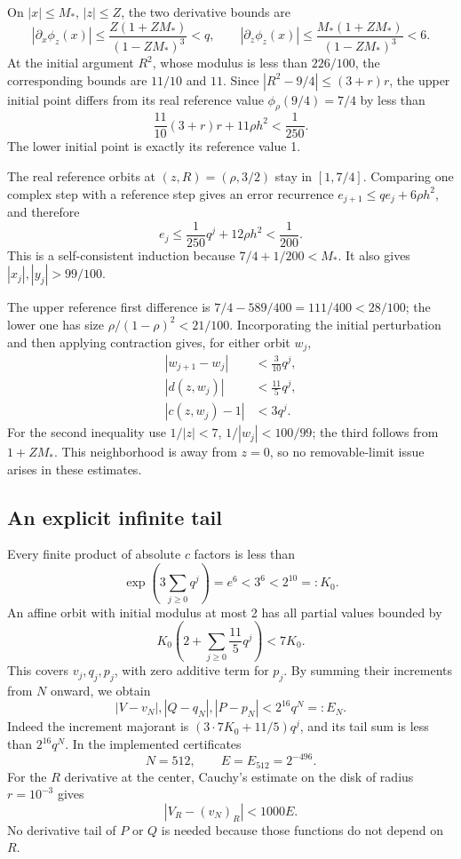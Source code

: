 \documentclass[11pt,letterpaper]{article}
\theoremstyle{remark}\newtheorem{remark}[theorem]{Remark}
\newcommand{\ph}{\phi_z}
\begin{document}
On $|x|\le M_*$, $|z|\le Z$, the two derivative bounds are
\[
 |\partial_x\ph(x)|
 \le\frac{Z(1+ZM_*)}{(1-ZM_*)^3}<q,
 \qquad
 |\partial_z\ph(x)|
 \le\frac{M_*(1+ZM_*)}{(1-ZM_*)^3}<6.
\]
At the initial argument $R^2$, whose modulus is less than $226/100$,
the corresponding bounds are $11/10$ and $11$. Since
$|R^2-9/4|\le(3+r)r$, the upper initial point differs from its
real reference value $\phi_\rho(9/4)=7/4$ by less than
\[
 \frac{11}{10}(3+r)r+11\rho h^2<\frac1{250}.
\]
The lower initial point is exactly its reference value 1.

The real reference orbits at $(z,R)=(\rho,3/2)$ stay in
$[1,7/4]$. Comparing one complex step with a reference step gives
an error recurrence $e_{j+1}\le q e_j+6\rho h^2$, and therefore
\begin{equation}\label{ivk:anc:referenceerror}
 e_j\le\frac1{250}q^j+12\rho h^2<\frac1{200}.
\end{equation}
This is a self-consistent induction because $7/4+1/200<M_*$.
It also gives $|x_j|,|y_j|>99/100$.

The upper reference first difference is
$7/4-589/400=111/400<28/100$; the lower one has size
$\rho/(1-\rho)^2<21/100$. Incorporating the initial perturbation
and then applying contraction gives, for either orbit $w_j$,
\begin{equation}\label{ivk:anc:tailpremises}
 \begin{split}
 |w_{j+1}-w_j|&<\frac3{10}q^j,\\
 |d(z,w_j)|&<\frac{11}{5}q^j,\\
 |c(z,w_j)-1|&<3q^j.
 \end{split}
\end{equation}
For the second inequality use $1/|z|<7$, $1/|w_j|<100/99$;
the third follows from $1+ZM_*$. This neighborhood is away from
$z=0$, so no removable-limit issue arises in these estimates.

\subsection{An explicit infinite tail}
Every finite product of absolute $c$ factors is less than
\[
 \exp\left(3\sum_{j\ge0}q^j\right)=e^6<3^6<2^{10}=:K_0.
\]
An affine orbit with initial modulus at most 2 has all partial
values bounded by
\[
 K_0\left(2+\sum_{j\ge0}\frac{11}{5}q^j\right)<7K_0.
\]
This covers $v_j,q_j,p_j$, with zero additive term for $p_j$.
By summing their increments from $N$ onward, we obtain
\begin{equation}\label{ivk:anc:tailbound}
 |V-v_N|, |Q-q_N|, |P-p_N|
 <2^{16}q^N=:E_N.
\end{equation}
Indeed the increment majorant is
$(3\cdot7K_0+11/5)q^j$, and its tail sum is less than
$2^{16}q^N$. In the implemented certificates
\begin{equation}\label{ivk:anc:E}
 N=512,\qquad E=E_{512}=2^{-496}.
\end{equation}
For the $R$ derivative at the center, Cauchy's estimate on the disk
of radius $r=10^{-3}$ gives
\begin{equation}\label{ivk:anc:derivtail}
 |V_R-(v_N)_R|<1000E.
\end{equation}
No derivative tail of $P$ or $Q$ is needed because those functions
do not depend on $R$.
\end{document}
